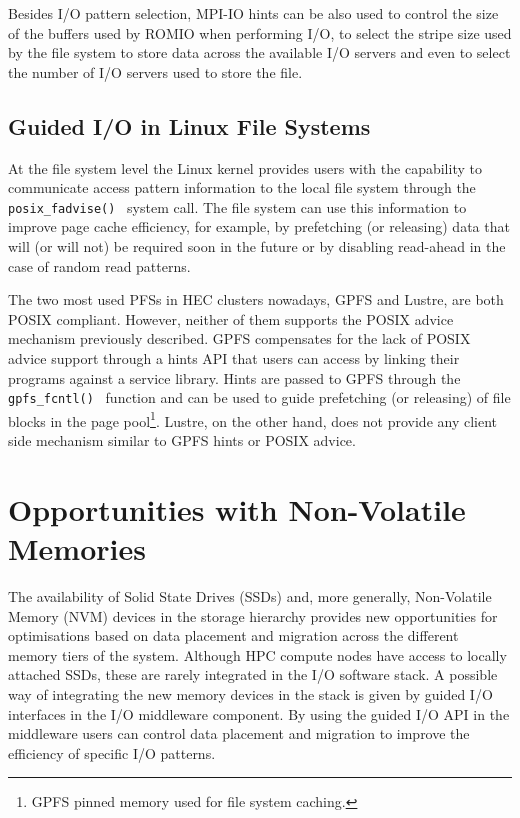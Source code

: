 Besides I/O pattern selection, MPI-IO hints can be also used to control the size of the buffers used by ROMIO when performing I/O, to select the stripe size used by the file system to store data across the available 
I/O servers and even to select the number of I/O servers used to store the file.

\subsection{Guided I/O in Linux File Systems} \label{subsec: posix-advice}
At the file system level the Linux kernel provides users with the capability to communicate access pattern information to the local file system through the \texttt{posix\_fadvise()}~\cite{AdviseAPI} system call. 
The file system can use this information to improve page cache efficiency, for example, by prefetching (or releasing) data that will (or will not) be required soon in the future or by disabling read-ahead in the 
case of random read patterns. %

The two most used PFSs in HEC clusters nowadays, GPFS and Lustre, are both POSIX compliant. However, neither of them supports the POSIX advice mechanism previously described. GPFS compensates for the lack of POSIX 
advice support through a hints API that users can access by linking their programs against a service library. Hints are passed to GPFS through the \texttt{gpfs\_fcntl()}~\cite{GPFSHINTS} function and can be used to 
guide prefetching (or releasing) of file blocks in the page pool\footnote{GPFS pinned memory used for file system caching.}. Lustre, on the other hand, does not provide any client side mechanism similar to GPFS hints 
or POSIX advice.

\section{Opportunities with Non-Volatile Memories} \label{sec: nvm}
The availability of Solid State Drives (SSDs) and, more generally, Non-Volatile Memory (NVM) devices in the storage hierarchy provides new opportunities for optimisations based on data placement and migration across 
the different memory tiers of the system. Although HPC compute nodes have access to locally attached SSDs, these are rarely integrated in the I/O software stack. A possible way of integrating the new memory devices 
in the stack is given by guided I/O interfaces in the I/O middleware component. By using the guided I/O API in the middleware users can control data placement and migration to improve the efficiency of specific I/O patterns.

